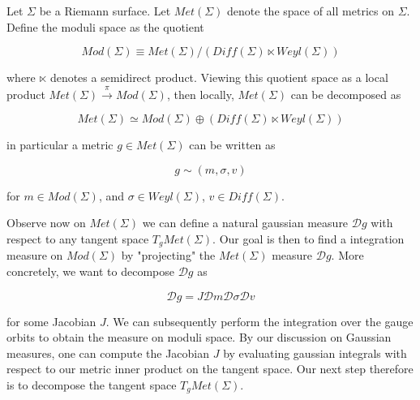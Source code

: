Let $\Sigma$ be a Riemann surface. Let $Met(\Sigma)$ denote the space of all metrics on $\Sigma$. Define the moduli space as the quotient

\begin{equation}
    Mod(\Sigma) \equiv Met(\Sigma)/(Diff(\Sigma) \ltimes Weyl(\Sigma))
\end{equation}

where $\ltimes$ denotes a semidirect product. Viewing this quotient space as a local product $Met(\Sigma) \xrightarrow{\pi} Mod(\Sigma)$, then locally, $Met(\Sigma)$ can be decomposed as

\begin{equation}
    Met(\Sigma) \simeq Mod(\Sigma)  \oplus (Diff(\Sigma) \ltimes Weyl(\Sigma))
\end{equation}

in particular a metric $g \in Met(\Sigma)$ can be written as

\begin{equation}
    g \sim (m, \sigma, v)
\end{equation}

for $m \in Mod(\Sigma)$, and $\sigma \in Weyl(\Sigma)$, $ v \in Diff(\Sigma)$.

Observe now on $Met(\Sigma)$ we can define a natural gaussian measure $\mathcal{D}g$ with respect to any tangent space $T_g Met(\Sigma)$. Our goal is then to find a integration measure on $Mod(\Sigma)$ by "projecting" the $Met(\Sigma)$ measure $\mathcal D g$. More concretely, we want to decompose $\mathcal D g$ as

\begin{equation}
    \mathcal D g = J \mathcal D m \mathcal D \sigma \mathcal D v
\end{equation}

for some Jacobian $J$. We can subsequently perform the integration over the gauge orbits to obtain the measure on moduli space. By our discussion on Gaussian measures, one can compute the Jacobian $J$ by evaluating gaussian integrals with respect to our metric inner product on the tangent space. Our next step therefore is to decompose the tangent space $T_g Met(\Sigma)$.
